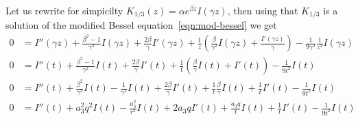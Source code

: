 \documentclass{article}
\theoremstyle{definition}
\theoremstyle{plain}
\newenvironment{verify}{\color{ForestGreen}}{\color{black}}
\newenvironment{todo}{\color{Coral}}{\color{black}}
\begin{document}
\begin{itemize}
\begin{todo}
\begin{verify}
Let us rewrite for simpicilty $K_{1/3}(z)=\alpha e^{\beta z} I(\gamma z)$, then using that $K_{1/3}$ is a solution of the modified Bessel equation~\eqref{eqn:mod-bessel} we get
\begin{align*}
0 &= I''(\gamma z)+\frac{\beta^2-1}{\gamma^2}I(\gamma z)+\frac{2\beta}{\gamma}I'(\gamma z)+\frac{1}{z}\left(\frac{\beta}{\gamma^2}I(\gamma z)+\frac{I'(\gamma z)}{\gamma}\right)-\frac{1}{9\gamma^2}\frac{1}{z^2} I(\gamma z) \\
0 &= I''(t)+\frac{\beta^2-1}{\gamma^2}I(t)+\frac{2\beta}{\gamma}I'(t)+\frac{1}{t}\left(\frac{\beta}{\gamma}I(t)+I'(t)\right)-\frac{1}{9t^2} I(t)\\
0 &= I''(t)+\frac{\beta^2}{\gamma^2}I(t)-\frac{1}{\gamma^2}I(t)+\frac{2\beta}{\gamma}I'(t)+\frac{1}{t}\frac{\beta}{\gamma}I(t)+\frac{1}{t}I'(t)-\frac{1}{9t^2} I(t)\\
0 &= I''(t)+a_3^2q^2 I(t)-\frac{a_3^2}{r^2}I(t)+2a_3 qI'(t)+\frac{a_3 q}{t}I(t)+\frac{1}{t}I'(t)-\frac{1}{9t^2} I(t)
\end{align*}


\end{verify}
\end{todo}
\end{itemize}
\end{document}
